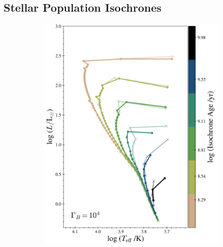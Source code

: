 \documentclass[useAMS,usenatbib]{mnras}
\begin{document}
\subsection{Stellar Population Isochrones}
\label{sub:isochrones}


\begin{figure}
\centering
   \begin{subfigure}{0.49\linewidth} \centering
     \includegraphics[scale=0.4]{plots/isos_cb4.png}
   \end{subfigure}
   \begin{subfigure}{0.49\linewidth} \centering

\end{subfigure}
\end{figure}
\end{document}
